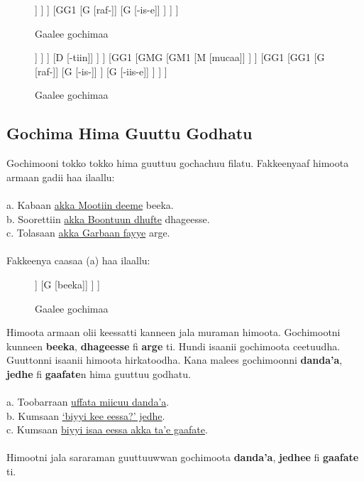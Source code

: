 \documentclass[11pt,b5paper]{book}
\begin{document}
\begin{figure}[H]										
	\caption{Gaalee gochimaa}
	\centering
	\begin{forest}
		[GGG
			[GG1
				[GMG
					[GM1
						[M [mucaa]]
					]
				]
				[GG1
					[G [raf-]]
					[G [-is-e]]
				]			
			]
		]
	\end{forest}
\end{figure}

\begin{figure}[H]										
	\caption{Gaalee gochimaa}
	\centering
	\begin{forest}
		[GGG
			[GDG
				[GD1
					[GMG
						[GM1
							[M [Tolasaa]]
						]
					]
					[D [-tiin]]
				]
			]
			[GG1
				[GMG
					[GM1
						[M [mucaa]]
					]
				]
				[GG1
					[GG1
						[G [raf-]]
						[G [-is-]]
					]
					[G [-iis-e]]
				]
			]
		]
	\end{forest}
\end{figure}

\subsection{Gochima Hima Guuttu Godhatu}
Gochimooni tokko tokko hima guuttuu gochachuu filatu. Fakkeenyaaf himoota armaan gadii haa ilaallu: \\
\\
a. Kabaan \underline{akka Mootiin deeme} beeka.\\
b. Soorettiin \underline{akka Boontuun dhufte} dhageesse.\\
c. Tolasaan \underline{akka Garbaan fayye} arge.\\
\\

Fakkeenya caasaa (a) haa ilaallu:
\\

\begin{figure}[H]										
	\caption{Gaalee gochimaa}
	\centering
	\begin{forest}
		[GGG
			[GG1
				[H [akka Mootiin deeme,roof]]
				[G [beeka]]
			]
		]
	\end{forest}
\end{figure}

Himoota armaan olii keessatti kanneen jala muraman himoota. Gochimootni kunneen \textbf{beeka}, \textbf{dhageesse} fi \textbf{arge} ti. Hundi isaanii gochimoota ceetuudha. Guuttonni isaanii himoota hirkatoodha. Kana malees gochimoonni \textbf{danda’a}, \textbf{jedhe} fi \textbf{gaafate}n hima guuttuu godhatu. \\
\\
a. Toobarraan \underline{uffata miicuu danda’a}.\\
b. Kumsaan \underline{‘biyyi kee eessa?’ jedhe}.\\
c. Kumsaan \underline{biyyi isaa eessa akka ta’e gaafate}.\\
\\
Himootni jala sararaman guuttuuwwan gochimoota \textbf{danda’a}, \textbf{jedhee} fi \textbf{gaafate} ti.\\
\end{document}
